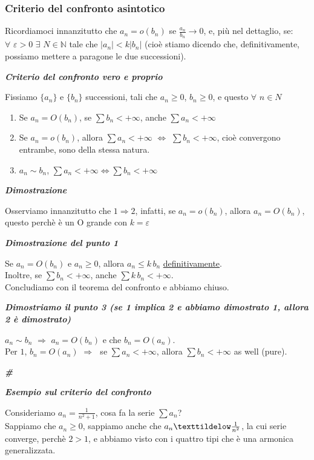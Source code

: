 \documentclass{article}
\theoremstyle{definition}
\newcommand{\N}{\mathbb{N}}
\newcommand{\cvd}{\begin{center} \textbf{\textit{\#}} \end{center}}
\begin{document}
\subsubsection{Criterio del confronto asintotico}
Ricordiamoci innanzitutto che $a_n= o(b_n)$ se $\frac{a_n}{b_n} \to 0$, e, più nel dettaglio, se:
\\
$\forall \,\, \varepsilon > 0 \,\, \exists \,\, N \in \N$ tale che $|a_n|<k|b_n|$ (cioè stiamo dicendo che, definitivamente, possiamo mettere a paragone le due successioni).
\\
\begin{center}
    \textbf{\textit{Criterio del confronto vero e proprio}}
\end{center}
Fissiamo $\{a_n\}$ e $\{b_n\}$ successioni, tali che $a_n \geqslant 0$, $b_n \geqslant 0$, e questo $\forall \,\, n \in N$
\begin{enumerate}
    \item Se $a_n=O(b_n)$, se $\sum b_n < +\infty$, anche $\sum a_n < +\infty$
    \item Se $a_n= o(b_n)$, allora $\sum a_n < +\infty \,\, \Longleftrightarrow \,\, \sum b_n < +\infty$, cioè convergono entrambe, sono della stessa natura.
    \item $a_n \sim b_n$, $\sum a_n < +\infty \Longleftrightarrow \sum b_n < +\infty$
    \end{enumerate}
    \begin{center}
        \textbf{\textit{Dimostrazione}}
    \end{center}
Osserviamo innanzitutto che $1 \Longrightarrow 2$, infatti, se $a_n = o(b_n)$, allora $a_n= O(b_n)$, questo perchè è un O grande con $k= \varepsilon$
\begin{center}
    \textbf{\textit{Dimostrazione del punto 1}}
\end{center}
Se $a_n=O(b_n)$ e $a_n \geqslant 0$, allora $a_n \leqslant k \, b_n$ \underline{definitivamente}.
\\
Inoltre, se $\sum b_n < +\infty$, anche $\sum k \, b_n < +\infty$.
\\
Concludiamo con il teorema del confronto e abbiamo chiuso.
\\
\begin{center}
    \textbf{\textit{Dimostriamo il punto 3 (se 1 implica 2 e abbiamo dimostrato 1, allora 2 è dimostrato)}}
\end{center}
$a_n \sim b_n \,\, \Longrightarrow \,\, a_n=O(b_n)$ e che $b_n=O(a_n)$.
\\
Per $1$, $b_n=O(a_n) \,\, \Longrightarrow \,\,$ se $\sum a_n < +\infty$, allora $\sum b_n < +\infty$ as well (pure).
\\
\cvd
\begin{center}
    \textbf{\textit{Esempio sul criterio del confronto}}
\end{center}
Consideriamo $a_n=\frac{1}{n^2+1}$, cosa fa la serie $\sum a_n$?
\\
Sappiamo che $a_n \geqslant 0$, sappiamo anche che $a_n \texttildelow \frac{1}{n^2}$, la cui serie converge, perchè $2 > 1$, e abbiamo visto con i quattro tipi che è una armonica generalizzata.
\end{document}
